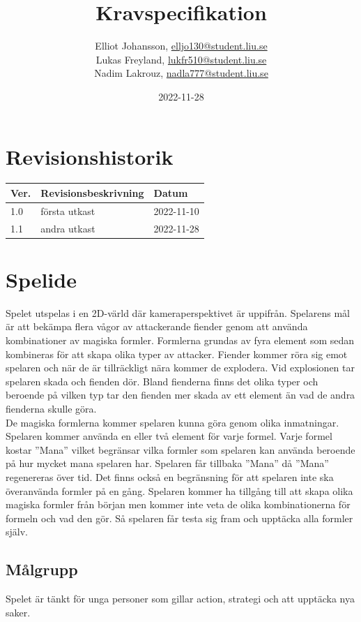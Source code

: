\documentclass[12pt]{TDP005mall}
\author{Elliot Johansson, \url{elljo130@student.liu.se}\\
  Lukas Freyland, \url{lukfr510@student.liu.se}\\
  Nadim Lakrouz, \url{nadla777@student.liu.se}}
\title{Kravspecifikation}
\date{2022-11-28}
\begin{document}
\projectpage

\tableofcontents
\clearpage

\section{Revisionshistorik}
\begin{table}[!h]
\begin{tabularx}{\linewidth}{|l|X|l|}
\hline
Ver. & Revisionsbeskrivning & Datum \\\hline
1.0 & första utkast & 2022-11-10 \\\hline
1.1 & andra utkast & 2022-11-28 \\\hline
\end{tabularx}
\end{table}


\section{Spelide}

Spelet utspelas i en 2D-värld där kameraperspektivet är uppifrån. Spelarens mål är att bekämpa flera vågor av attackerande fiender genom att använda kombinationer av magiska formler. Formlerna grundas av fyra element som sedan kombineras för att skapa olika typer av attacker. Fiender kommer röra sig emot spelaren och när de är tillräckligt nära kommer de explodera. Vid explosionen tar spelaren skada och fienden dör. Bland fienderna finns det olika typer och beroende på vilken typ tar den fienden mer skada av ett element än vad de andra fienderna skulle göra.\\
De magiska formlerna kommer spelaren kunna göra genom olika inmatningar. Spelaren kommer använda en eller två element för varje formel. Varje formel kostar ''Mana'' vilket begränsar vilka formler som spelaren kan använda beroende på hur mycket mana spelaren har. Spelaren får tillbaka ''Mana'' då ''Mana'' regenereras över tid. Det finns också en begränsning för att spelaren inte ska överanvända formler på en gång.
Spelaren kommer ha tillgång till att skapa olika magiska formler från början men kommer inte veta de olika kombinationerna för formeln och vad den gör. Så spelaren får testa sig fram och upptäcka alla formler själv. 


\subsection{Målgrupp}
Spelet är tänkt för unga personer som gillar action, strategi och att upptäcka nya saker.
\end{document}
